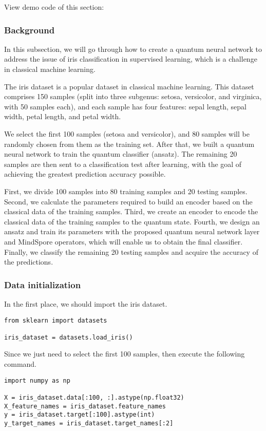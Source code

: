 View demo code of this section: 
\subsubsection{Background}
In this subsection, we will go through how to create a quantum neural network to address the issue of iris classification in supervised learning, which is a challenge in classical machine learning.

The iris dataset is a popular dataset in classical machine learning. This dataset comprises 150 samples (split into three subgenus: setosa, versicolor, and virginica, with 50 samples each), and each sample has four features: sepal length, sepal width, petal length, and petal width.

We select the first 100 samples (setosa and versicolor), and 80 samples will be randomly chosen from them as the training set. After that, we built a quantum neural network to train the quantum classifier (ansatz). The remaining 20 samples are then sent to a classification test after learning, with the goal of achieving the greatest prediction accuracy possible.

First, we divide 100 samples into 80 training samples and 20 testing samples. Second, we calculate the parameters required to build an encoder based on the classical data of the training samples. Third, we create an encoder to encode the classical data of the training samples to the quantum state. Fourth, we design an ansatz and train its parameters with the proposed quantum neural network layer and MindSpore operators, which  will enable us to obtain the final classifier. Finally, we classify the remaining 20 testing samples and acquire the accuracy of the predictions.

\subsubsection{Data initialization}
In the first place, we should import the iris dataset.

\begin{lstlisting}
from sklearn import datasets

iris_dataset = datasets.load_iris()
\end{lstlisting}

Since we just need to select the first 100 samples, then execute the following command.

\begin{lstlisting}
import numpy as np

X = iris_dataset.data[:100, :].astype(np.float32)
X_feature_names = iris_dataset.feature_names
y = iris_dataset.target[:100].astype(int)
y_target_names = iris_dataset.target_names[:2]
\end{lstlisting}

